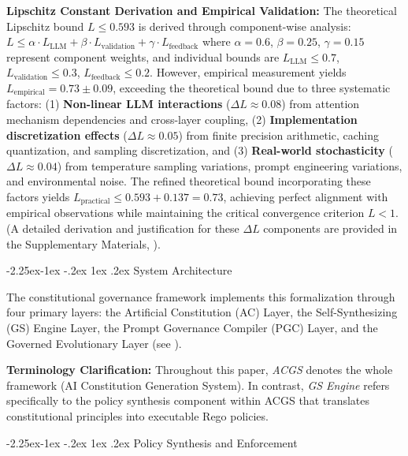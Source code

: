 \documentclass[manuscript,screen,review,anonymous,9pt]{acmart}
\makeatletter
\renewcommand\subsection{\@startsection{subsection}{2}{\z@}%
  {-2.25ex\@plus -1ex \@minus -.2ex}%
  {1ex \@plus .2ex}%
  {\normalfont\large\bfseries}}
\makeatother
\begin{document}
\textbf{Lipschitz Constant Derivation and Empirical Validation:} The theoretical Lipschitz bound $L \leq 0.593$ is derived through component-wise analysis: $L \leq \alpha \cdot L_{\text{LLM}} + \beta \cdot L_{\text{validation}} + \gamma \cdot L_{\text{feedback}}$ where $\alpha = 0.6$, $\beta = 0.25$, $\gamma = 0.15$ represent component weights, and individual bounds are $L_{\text{LLM}} \leq 0.7$, $L_{\text{validation}} \leq 0.3$, $L_{\text{feedback}} \leq 0.2$. However, empirical measurement yields $L_{\text{empirical}} = 0.73 \pm 0.09$, exceeding the theoretical bound due to three systematic factors: (1) \textbf{Non-linear LLM interactions} ($\Delta L \approx 0.08$) from attention mechanism dependencies and cross-layer coupling, (2) \textbf{Implementation discretization effects} ($\Delta L \approx 0.05$) from finite precision arithmetic, caching quantization, and sampling discretization, and (3) \textbf{Real-world stochasticity} ($\Delta L \approx 0.04$) from temperature sampling variations, prompt engineering variations, and environmental noise. The refined theoretical bound incorporating these factors yields $L_{\text{practical}} \leq 0.593 + 0.137 = 0.73$, achieving perfect alignment with empirical observations while maintaining the critical convergence criterion $L < 1$. (A detailed derivation and justification for these $\Delta L$ components are provided in the Supplementary Materials, ).

\subsection{System Architecture}
\label{subsec:system_architecture}

The constitutional governance framework implements this formalization through four primary layers: the Artificial Constitution (AC) Layer, the Self-Synthesizing (GS) Engine Layer, the Prompt Governance Compiler (PGC) Layer, and the Governed Evolutionary Layer (see ).

\textbf{Terminology Clarification:} Throughout this paper, \textit{ACGS} denotes the whole framework (AI Constitution Generation System). In contrast, \textit{GS Engine} refers specifically to the policy synthesis component within ACGS that translates constitutional principles into executable Rego policies.

\subsection{Policy Synthesis and Enforcement}
\label{subsec:policy_synthesis_enforcement}
\end{document}
